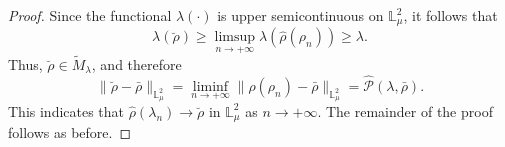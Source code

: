 \documentclass[10pt,a4paper]{amsart}
\begin{document}
\begin{proof}
Since the functional $\lambda(\cdot)$ is upper semicontinuous on $\mathbb{L}%
_{\mu}^{2}$, it follows that
\begin{equation*}
\lambda(\breve{\rho})\geq \limsup_{n\to+\infty}\lambda(\hat{\rho}%
(\rho_n))\geq \lambda.
\end{equation*}
Thus, $\breve{\rho} \in \tilde{M}_{\lambda}$, and therefore
\begin{equation*}
\|\breve{\rho} -\bar{\rho}\|_{\mathbb{L}^2_{\mu }}= \liminf_{n\to +\infty}\|%
\hat{\rho}(\rho_n)-\bar{\rho}\|_{\mathbb{L}^2_{\mu }}= \hat{\mathcal{P}}%
(\lambda,\bar{\rho}).
\end{equation*}
This indicates that $\hat{\rho}(\lambda_n) \to \breve{\rho}$ in $\mathbb{L}%
^2_{\mu}$ as $n \to +\infty$. The remainder of the proof follows as before.
\end{proof}
\end{document}
